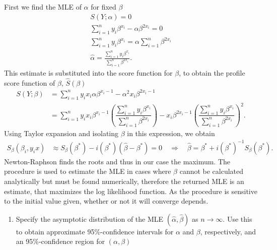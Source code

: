 First we find the MLE of $\alpha$ for fixed $\beta$
\begin{align*}
    S\left( Y; \alpha \right) = 0 \\
    \sum_{i=1}^{n} y_i \beta^{x_i} - \alpha \beta^{2 x_i} = 0 \\
    \sum_{i=1}^{n} y_i \beta^{x_i} = \alpha \sum_{i=1}^{n} \beta^{2 x_i} \\
    \hat{\alpha} = \frac{\sum_{i=1}^{n} y_i \beta^{x_i}}{\sum_{i=1}^{n} \beta^{2x_i}}.
\end{align*}
This estimate is substituted into the score function for $\beta$, to obtain the profile score function of $\beta$, $\hat{S}(\beta)$
\begin{align*}
    S\left( Y; \beta \right) &= \sum_{i=1}^n y_i x_i \alpha \beta^{x_i - 1} - \alpha^2 x_i \beta^{2 x_i - 1}\\
     &= \sum_{i=1}^n y_i x_i \beta^{x_i - 1} \left( \dfrac{\sum_{i=1}^n y_i\beta^{x_i}}{\sum_{i=1}^n \beta^{2x_i}}\right) - x_i\beta^{2x_i-1} \left( \dfrac{\sum_{i=1}^n y_i\beta^{x_i}}{\sum_{i=1}^n \beta^{2x_i}}\right)^2.
\end{align*}
Using Taylor expansion and isolating $\beta$ in this expression, we obtain
\begin{align*}
    S_\beta (\beta_i, y_i x) &\approx S_\beta(\beta^*) - i(\beta^*) (\hat{\beta} - \beta^*) = 0 \quad \Rightarrow \quad
    \hat{\beta} = \beta^* + i(\beta^*)^{-1} S_\beta (\beta^*).
\end{align*}
Newton-Raphson finds the roots and thus in our case the maximum. 
The procedure is used to estimate the MLE in cases where $\beta$ cannot be calculated analytically but must be found numerically, therefore the returned MLE is an estimate, that maximizes the log likelihood function.  
As the procedure is sensitive to the initial value given, whether or not it will converge depends.

\begin{enumerate}[resume]
    \item Specify the asymptotic distribution of the MLE $(\hat{\alpha}, \hat{\beta})$ as $n \rightarrow \infty$.
    Use this to obtain approximate 95\%-confidence intervals for $\alpha$ and $\beta$, respectively, and an 95\%-confidence region for $(\alpha, \beta)$
\end{enumerate}

